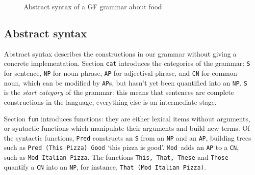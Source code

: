 \documentclass[11pt]{article}
\def\t#1{\texttt{#1}}
\begin{document}
\begin{figure}[h]
\centering

\begin{Shaded}
\begin{Highlighting}[]
 \FunctionTok{=} \NormalTok{\{}
  \FunctionTok{=}  \NormalTok{;}
     \NormalTok{; } \NormalTok{; } \NormalTok{; } \NormalTok{;}
    \OtherTok{ :}  \OtherTok{->}  \OtherTok{->}  \NormalTok{;                          }
    \NormalTok{, }\NormalTok{, }\NormalTok{, }\OtherTok{ :}  \OtherTok{->}  \NormalTok{;           }
    \OtherTok{ :}  \OtherTok{->}  \OtherTok{->}  \NormalTok{;                          }
    \NormalTok{, }\NormalTok{, }\NormalTok{, }\OtherTok{ :}  \NormalTok{;}
    \NormalTok{, }\NormalTok{, }\NormalTok{, }\OtherTok{ :}  \NormalTok{;}
\end{Highlighting}
\end{Shaded}
  \caption{Abstract syntax of a GF grammar about food}
\label{fig:exampleGrammar}
\end{figure}

\subsection{Abstract syntax}


Abstract syntax describes the constructions in our grammar without
giving a concrete implementation.
Section \t{cat} introduces the categories of the grammar: \t{S} for sentence,
\t{NP} for noun phrase,  \t{AP} for adjectival phrase, and \t{CN} for
common noun, which can be modified by \t{AP}s, but hasn't yet been
quantified into an \t{NP}. \t{S} is the \emph{start category} of the grammar:
this means that sentences are complete constructions in the language,
everything else is an intermediate stage.

Section \t{fun} introduces functions: they are either lexical
items without arguments, or syntactic functions which manipulate their
arguments and build new terms. Of the syntactic functions, \t{Pred}
constructs an \t{S} from an \t{NP} and an \t{AP}, building trees
such as \t{Pred (This Pizza) Good} `this pizza is good'. \t{Mod}~adds
an \t{AP} to a \t{CN}, such as \t{Mod Italian   Pizza}. The functions
\t{This, That, These} and \t{Those} quantify a \t{CN} into an \t{NP},
for instance, \t{That (Mod Italian Pizza)}. 
\end{document}
